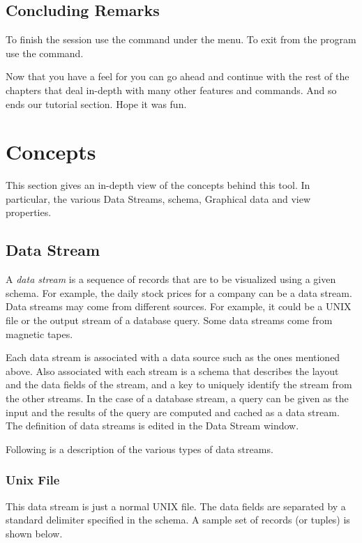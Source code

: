 \subsection{Concluding Remarks}

To finish the session use the  command under the
 menu. To exit from the program use the 
command.
	
Now that you have a feel for \Devise you can go ahead and continue
with the rest of the chapters that deal in-depth with many other
features and commands. And so ends our tutorial section. Hope it was
fun.

\section{\Devise Concepts}

This section gives an in-depth view of the concepts behind this
tool. In particular, the various Data Streams, schema, Graphical data
and view properties.

\subsection{Data Stream}

A {\em data stream} is a sequence of records that are to be visualized
using a given schema. For example, the daily stock prices for a
company can be a data stream. Data streams may come from different
sources. For example, it could be a UNIX file or the output stream of
a database query. Some data streams come from magnetic tapes.

Each data stream is associated with a data source such as the ones
mentioned above. Also associated with each stream is a schema that
describes the layout and the data fields of the stream, and a key to
uniquely identify the stream from the other streams. In the case of a
database stream, a query can be given as the input and the results of
the query are computed and cached as a data stream. The definition of
data streams is edited in the Data Stream window.

Following is a description of the various types of data streams.

\subsubsection{Unix File}

This data stream is just a normal UNIX file. The data fields are
separated by a standard delimiter specified in the schema. A sample
set of records (or tuples) is shown below.

